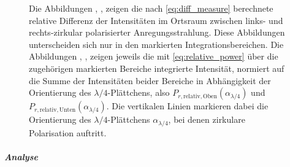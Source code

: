 \documentclass[titlepage,  ngerman]{article}
\begin{document}
\begin{figure}[h]
			\caption[Differenz- und Integrationsdaten PSHE Ortsraum]{Die Abbildungen , ,  zeigen die nach \eqref{eq:diff_measure} berechnete relative Differenz der Intensitäten im Ortsraum zwischen links- und rechts-zirkular polarisierter Anregungsstrahlung. Diese Abbildungen unterscheiden sich nur in den markierten Integrationsbereichen. Die Abbildungen , ,  zeigen jeweils die mit \eqref{eq:relative_power} über die zugehörigen markierten Bereiche integrierte Intensität, normiert auf die Summe der Intensitäten beider Bereiche in Abhängigkeit der Orientierung des $\lambda/4$-Plättchens, also $P_{r, \mathrm{relativ}, \mathrm{Oben}}(\alpha_{\lambda/4})$ und $P_{r, \mathrm{relativ}, \mathrm{Unten}}(\alpha_{\lambda/4})$. Die vertikalen Linien markieren dabei die Orientierung des $\lambda/4$-Plättchens $\alpha_{\lambda/4}$, bei denen zirkulare Polarisation auftritt.}
			\label{fig:spin_hall_measure_diff_fp}
		\end{figure}
		\subparagraph{Analyse}
\end{document}
